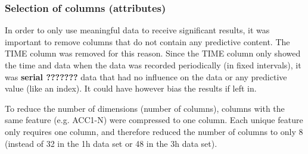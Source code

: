 \subsubsection{Selection of columns (attributes)}
In order to only use meaningful data to receive significant results, it was important to remove columns that do not contain any predictive content. The TIME column was removed for this reason. Since the TIME column only showed the time and data when the data was recorded periodically (in fixed intervals), it was \textbf{serial ???????} data that had no influence on the data or any predictive value (like an index). It could have however bias the results if left in. 

To reduce the number of dimensions (number of columns), columns with the same feature (e.g. ACC1-N) were compressed to one column. Each unique feature only requires one column, and therefore reduced the number of columns to only 8 (instead of 32 in the 1h data set or 48 in the 3h data set).




